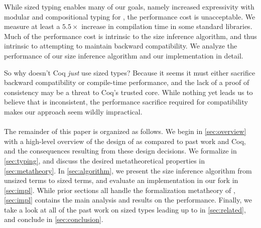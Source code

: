 While sized typing enables many of our goals, namely increased expressivity with modular and compositional typing for \cofixpoints, the performance cost is unacceptable.
We measure at least a $5.5 \times$ increase in compilation time in some standard libraries.
Much of the performance cost is intrinsic to the size inference algorithm, and thus intrinsic to attempting to maintain backward compatibility.
We analyze the performance of our size inference algorithm and our implementation in detail.

So why doesn't Coq \emph{just} use sized types?
Because it seems it must either sacrifice backward compatibility or compile-time performance,
and the lack of a proof of consistency may be a threat to Coq's trusted core.
While nothing yet leads us to believe that \lang is inconsistent,
the performance sacrifice required for compatibility makes our approach seem wildly impractical.

\paragraph*{} The remainder of this paper is organized as follows.
We begin in \autoref{sec:overview} with a high-level overview of the design of \lang as compared to past work and Coq,
and the consequences resulting from these design decisions.
We formalize \lang in \autoref{sec:typing},
and discuss the desired metatheoretical properties in \autoref{sec:metatheory}.
In \autoref{sec:algorithm}, we present the size inference algorithm from unsized terms to sized \lang terms,
and evaluate an implementation in our fork in \autoref{sec:impl}.
While prior sections all handle the formalization metatheory of \lang,
\autoref{sec:impl} contains the main analysis and results on the performance.
Finally, we take a look at all of the past work on sized types leading up to \lang in \autoref{sec:related}, and conclude in \autoref{sec:conclusion}.

